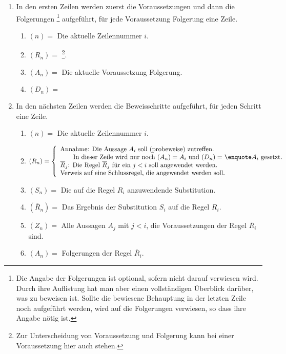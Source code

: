 \begin{enumerate}
	\item In den ersten Zeilen werden zuerst die Voraussetzungen und dann die Folgerungen%
	\footnote{%
		Die Angabe der Folgerungen ist optional, sofern nicht darauf verwiesen wird.
		Durch ihre Auflistung hat man aber einen vollständigen Überblick darüber, was zu beweisen ist.
		Sollte die bewiesene Behauptung in der letzten Zeile noch aufgeführt werden, wird auf die Folgerungen verwiesen, so dass ihre Angabe nötig ist.
	}
	aufgeführt, für jede Voraussetzung \textbzw Folgerung eine Zeile.
	\begin{enumerate}
		\item $(n)   =$ Die aktuelle Zeilennummer $i$.
		\item $(R_n) =$ %
		\footnote{Zur Unterscheidung von Voraussetzung und Folgerung kann bei einer Voraussetzung hier auch   stehen.}.
		\item $(A_n) =$ Die aktuelle Voraussetzung \textbzw Folgerung.
		\item $(D_n) =$ 
	\end{enumerate}
	\item In den nächsten Zeilen werden die Beweisschritte aufgeführt, für jeden Schritt eine Zeile.
	\begin{enumerate}
		\item $(n) =$ Die aktuelle Zeilennummer $i$.
		\item $(R_n) =
		\left\{
			\begin{array}{l}
				\text{Annahme: Die Aussage $A_i$ soll (probeweise) zutreffen.}\\
				\qquad \text{In dieser Zeile wird nur noch $(A_n) = A_i$ und $(D_n) =$ \strqt{$A_i$} gesetzt.}\\
				\text{$\overline{R}_j$: Die Regel $\overline{R}_j$ für ein $j < i$ soll angewendet werden.}\\
				\text{Verweis auf eine Schlussregel, die angewendet werden soll.}
			\end{array}
		\right.$
		\item $(S_n) =$ Die auf die Regel $R_i$ anzuwendende Substitution.
		\item $(\overline{R}_n) =$ Das Ergebnis der Substitution $S_i$ auf die Regel $R_i$.
		\item $(Z_n) =$ Alle Aussagen $A_j$ mit $j < i$, die Voraussetzungen der Regel $\overline{R}_i$ sind.
		\item $(A_n) =$ Folgerungen der Regel $\overline{R}_i$.

\end{enumerate}
\end{enumerate}
